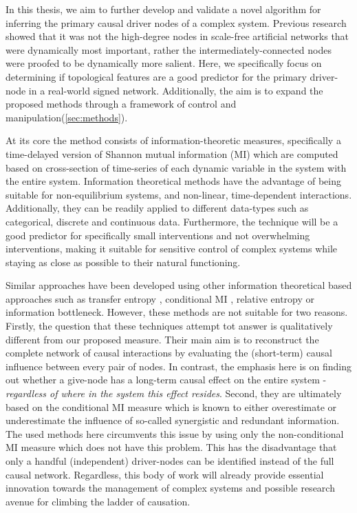 \documentclass[twoside, twocolumn]{article}
\begin{document}
	In this thesis, we aim to further develop and validate a novel algorithm for inferring the primary causal driver nodes of a complex system\cite{Quax2013}. Previous research showed that it was not the high-degree nodes in scale-free artificial networks that were dynamically most important, rather the intermediately-connected nodes were proofed to be dynamically more salient. Here, we specifically focus on determining if topological features are a good predictor for the primary driver-node in a real-world signed network.  Additionally, the aim is to expand the proposed methods through a framework of control and manipulation(\ref{sec:methods}).

	At its core the method consists of information-theoretic measures, specifically a time-delayed version of Shannon mutual information (MI)\cite{Cover2005} which are computed based on cross-section of time-series of each dynamic variable in the system with the entire system. Information theoretical methods have the advantage of being suitable for non-equilibrium systems, and non-linear,  time-dependent interactions. Additionally, they can be readily applied to different data-types such as categorical, discrete and continuous data. Furthermore, the technique will be a good predictor for specifically small interventions and not overwhelming interventions, making it suitable for sensitive control of complex systems while staying as close as possible to their natural functioning.

	Similar approaches have been developed using other information theoretical based approaches such as transfer entropy \cite{Eichler2006}, conditional MI \cite{Wibral2014}, relative entropy\cite{AY2008} or information bottleneck\cite{Tishby2000}. However, these methods are not suitable for two reasons. Firstly, the  question that these techniques attempt tot answer is qualitatively different from our proposed measure. Their main aim is to reconstruct the complete network of causal interactions by evaluating the (short-term) causal influence between every pair of nodes. In contrast, the emphasis here is on finding out whether a give-node has a long-term causal effect on the entire system - \textit{regardless of where in the system this effect resides}. Second, they are ultimately based on the conditional MI measure which is known to either overestimate or underestimate the influence of so-called synergistic and redundant information\cite{James2016a}. The used methods here circumvents this issue by using only the non-conditional MI measure which does not have this problem. This has the disadvantage that only a handful (independent) driver-nodes can be identified instead of the full causal network. Regardless, this body of work will already provide essential innovation towards the management of complex systems and possible research avenue for climbing the ladder of causation.
\end{document}
